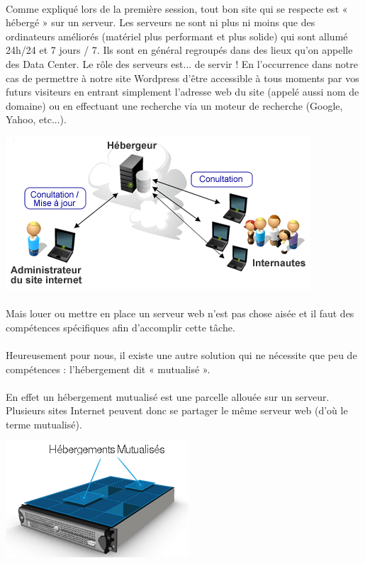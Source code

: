 \documentclass[10pt,a4paper]{article}
\begin{document}
\paragraph{}Comme expliqué lors de la première session, tout bon site qui se respecte est « hébergé » sur un serveur. Les serveurs ne sont ni plus ni moins que des ordinateurs améliorés (matériel plus performant et plus solide) qui sont allumé 24h/24 et 7 jours / 7. Ils sont en général regroupés dans des lieux qu'on appelle des Data Center. Le rôle des serveurs est... de servir ! En l'occurrence dans notre cas de permettre à notre site Wordpress d'être accessible à tous moments par vos futurs visiteurs en entrant simplement l'adresse web du site (appelé aussi nom de domaine) ou en effectuant une recherche via un moteur de recherche (Google, Yahoo, etc...).
\begin{center}
\includegraphics[scale=0.5]{img/0006.png}
\end{center}
\paragraph{}Mais louer ou mettre en place un serveur web n'est pas chose aisée et il faut des compétences spécifiques afin d'accomplir cette tâche.
\paragraph{}Heureusement pour nous, il existe une autre solution qui ne nécessite que peu de compétences : l'hébergement dit « mutualisé ».
\paragraph{}En effet un hébergement mutualisé est une parcelle allouée sur un serveur. Plusieurs sites Internet peuvent donc se partager le même serveur web (d'où le terme mutualisé).
\begin{center}
\includegraphics[scale=0.5]{img/0007.png}
\end{center}
\end{document}
